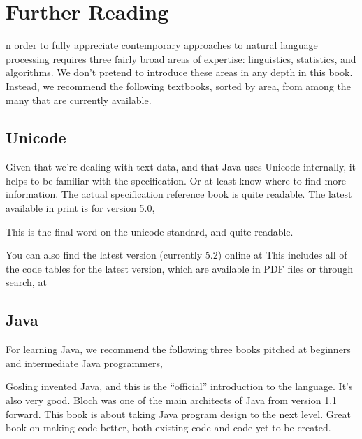 \chapter{Further Reading}\label{appendix:reading}

n order to fully appreciate contemporary approaches to natural language
processing requires three fairly broad areas of expertise:
linguistics, statistics, and algorithms.  We don't pretend to
introduce these areas in any depth in this book.  Instead, we
recommend the following textbooks, sorted by area, from among the many
that are currently available.

\section{Unicode}

Given that we're dealing with text data, and that Java uses Unicode
internally, it helps to be familiar with the specification.  Or at
least know where to find more information.  The actual specification
reference book is quite readable.  The latest available in print is
for version 5.0,
%
\begin{itemize}
{This is the final word on the unicode standard, and
quite readable.}
\end{itemize}
%
You can also find the latest version (currently 5.2) online at
%
%
This includes all of the code tables for the latest version, which are
available in PDF files or through search, at 
%
\begin{quote}
\end{quote}


\section{Java}

For learning Java, we recommend the following three books pitched at
beginners and intermediate Java programmers,
%
\begin{itemize}
{Gosling invented Java, and this is the ``official'' introduction to the
language.  It's also very good.}
%
{Bloch was one of the main architects of Java from
version 1.1 forward.  This book is about taking Java program design
to the next level.}
%
{Great book on making code better, both existing
code and code yet to be created.}
\end{itemize}
%


